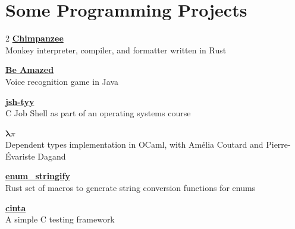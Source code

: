 \documentclass[12pt]{article}
\newcommand{\entry}[4]{{{\textbf{#1}}} \hfill #3 \\ #2 \hfill #4}
\begin{document}
\newpage

\section{Some Programming Projects}

\begin{paracol}{2}
	\entry{\href{https://github.com/Yag000/chimpanzee}{Chimpanzee}}{Monkey interpreter, compiler, and formatter written in Rust}{ }{ }
	\medskip
	\switchcolumn

	\entry{\href{https://github.com/GabinDDL/L2S2-GYTMY-Game}{Be Amazed}}{Voice recognition game in Java}{ }{ }
	\medskip
	\switchcolumn

	\entry{\href{https://github.com/Yag000/jsh-tyy}{jsh-tyy}}{C Job Shell as part of an operating systems course}{ }{ }
	\medskip
	\switchcolumn

	\entry{\href{https://moule.informatique.univ-paris-diderot.fr/iglesias/U3bbU3c0}{$\pmb\lambda\pi$}}{Dependent types implementation in OCaml, with Amélia Coutard and Pierre-Évariste Dagand}{ }{ }
	\medskip
	\switchcolumn

	\entry{\href{https://github.com/Yag000/enum_stringify}{enum\_stringify}}{Rust set of macros to generate string conversion functions for enums }{ }{ }
	\medskip
	\switchcolumn

	\entry{\href{https://github.com/Yag000/cinta}{cinta}}{A simple C testing framework}{ }{ }
	\switchcolumn
\end{paracol}

\nocite{*}
\renewcommand{\refname}{Publications} %


\end{document}
